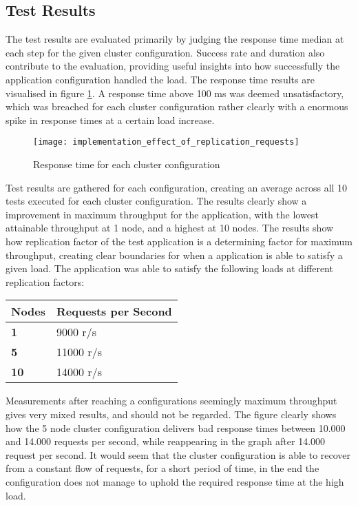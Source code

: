 \subsection{Test Results}
The test results are evaluated primarily by judging the response time median at each step for the given cluster configuration. Success rate and duration also contribute to the evaluation, providing useful insights into how successfully the application configuration handled the load. The response time results are visualised in figure \ref{fig:implementation_effect_of_replication_requests}. A response time above 100 ms was deemed unsatisfactory, which was breached for each cluster configuration rather clearly with a enormous spike in response times at a certain load increase. 

\begin{figure}[!htb]
  \texttt{[image: implementation\_effect\_of\_replication\_requests]}  
  \caption{Response time for each cluster configuration}
  \label{fig:implementation_effect_of_replication_requests}
\end{figure}

Test results are gathered for each configuration, creating an average across all 10 tests executed for each cluster configuration. The results clearly show a improvement in maximum throughput for the application, with the lowest attainable throughput at 1 node, and a highest at 10 nodes. The results show how replication factor of the test application is a determining factor for maximum throughput, creating clear boundaries for when a application is able to satisfy a given load. The application was able to satisfy the following loads at different replication factors:

\begin{center}
\begin{tabular}{ |p{2cm}|p{5cm}|  }
 \hline
{\textbf{Nodes}} & {\textbf{Requests per Second}}\\
 \hline
 \textbf{1} & 9000 r/s\\
 \hline
 \textbf{5} & 11000 r/s\\ 
 \hline
 \textbf{10} & 14000 r/s\\ 
 \hline
\end{tabular}
\end{center}

Measurements after reaching a configurations seemingly maximum throughput gives very mixed results, and should not be regarded. The figure clearly shows how the 5 node cluster configuration delivers bad response times between 10.000 and 14.000 requests per second, while reappearing in the graph after 14.000 request per second. It would seem that the cluster configuration is able to recover from a constant flow of requests, for a short period of time, in the end the configuration does not manage to uphold the required response time at the high load.

